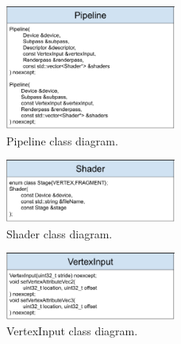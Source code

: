 \documentclass[12pt]{report}
\newcommand{\figurewidth}{0.6\textwidth}
\newcommand{\imagewidth}{0.5\textwidth}
\theoremstyle{definition}
\begin{document}
  \begin{figure}
    \centering
    \includegraphics[width=\imagewidth]{images/class_pipeline.png}
    \caption{Pipeline class diagram.}
    \label{fig:class_pipeline}
  \end{figure}

  \begin{figure}
    \centering
    \includegraphics[width=\imagewidth]{images/class_shader.png}
    \caption{Shader class diagram.}
    \label{fig:class_shader}
  \end{figure}

  \begin{figure}
    \centering
    \includegraphics[width=\imagewidth]{images/class_vertexinput.png}
    \caption{VertexInput class diagram.}
    \label{fig:class_vertexinput}
  \end{figure}
\end{document}
